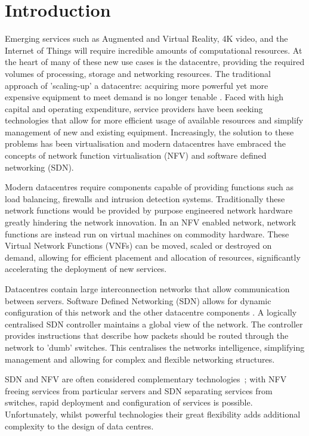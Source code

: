 
\section{Introduction}
\label{sec:introduction}
Emerging services such as Augmented and Virtual Reality, 4K video, and the Internet of Things will require incredible amounts of computational resources\cite{AndrewsBCHLSZ14}. At the heart of many of these new use cases is the datacentre, providing the required volumes of processing, storage and networking resources. The traditional approach of 'scaling-up' a datacentre: acquiring more powerful yet more expensive equipment to meet demand is no longer tenable \cite{VahdatAFMPR10}. Faced with high capital and operating expenditure, service providers have been seeking technologies that allow for more efficient usage of available resources and simplify management of new and existing equipment. Increasingly, the solution to these problems has been virtualisation \cite{HeddeghemLLCPD14} and modern datacentres have embraced the concepts of network function virtualisation (NFV) and software defined networking (SDN).

Modern datacentres require components capable of providing functions such as load balancing, firewalls and intrusion detection systems. Traditionally these network functions would be provided by purpose engineered network hardware greatly hindering the network innovation. In an NFV enabled network, network functions are instead run on virtual machines on commodity hardware. These Virtual Network Functions (VNFs) can be moved, scaled or destroyed on demand, allowing for efficient placement and allocation of resources, significantly accelerating the deployment of new services.

Datacentres contain large interconnection networks that allow communication between servers. Software Defined Networking (SDN) allows for dynamic configuration of this network and the other datacentre components \cite{KimF13,HaresW13}. A logically centralised SDN controller maintains a global view of the network. The controller provides instructions that describe how packets should be routed through the network to 'dumb' switches. This centralises the networks intelligence, simplifying management and allowing for complex and flexible networking structures.

SDN and NFV are often considered complementary technologies~\cite{MatiasGTUJ15}; with NFV freeing services from particular servers and SDN separating services from switches, rapid deployment and configuration of services is possible. Unfortunately, whilst powerful technologies their great flexibility adds additional complexity to the design of data centres. 

